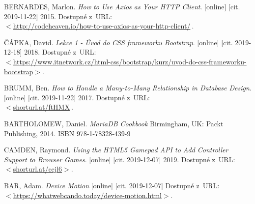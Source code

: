 \begin{literatura}{99}
	BERNARDES, Marlon.
	\emph{How to Use Axios as Your HTTP Client}. [online] [cit. 2019-11-22]
	2015. Dostupné z~URL:\\ \(<\)\url{http://codeheaven.io/how-to-use-axios-as-your-http-client/}\(\>\).

	ČÁPKA, David.
	\emph{Lekce 1 - Úvod do CSS frameworku Bootstrap}. [online] [cit. 2019-12-18]
	2018. Dostupné z~URL:\\ \(<\)\url{https://www.itnetwork.cz/html-css/bootstrap/kurz/uvod-do-css-frameworku-bootstrap}\(>\).

	BRUMM, Ben.
	\emph{How to Handle a Many-to-Many Relationship in Database Design}. [online] [cit. 2019-11-22]
	2017. Dostupné z~URL:\\ \(<\)\url{shorturl.at/ftHMX}\(\>\).

	BARTHOLOMEW, Daniel.
	\emph{MariaDB Cookbook}
	Birmingham, UK: Packt Publishing, 2014. ISBN 978-1-78328-439-9

	CAMDEN, Raymond.
	\emph{Using the HTML5 Gamepad API to Add Controller Support to Browser Games}. [online] [cit. 2019-12-07]
	2019. Dostupné z~URL:\\ 
	\(<\)\url{shorturl.at/cejl6}\(>\).

	BAR, Adam.
	\emph{Device Motion} [online] [cit. 2019-12-07]
	 Dostupné z~URL:\\ 
	\(<\)\url{https://whatwebcando.today/device-motion.html}\(>\).

















































































\end{literatura}


